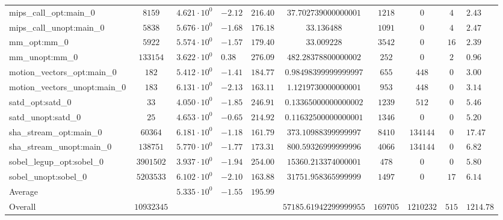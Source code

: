 \begin{tabular}{|l|c|HHc|c|c|c|cH|}
mips\_call\_opt:main\_0                         & $ 8159     $ & $ 4.621 \cdot 10^{0} $ & $ -2.12 $ & $ 216.40 $ & $ 37.702739000000001   $ & $ 1218   $ & $ 0       $ & $ 4   $ & $ 2.43    $ \\
mips\_call\_unopt:main\_0                       & $ 5838     $ & $ 5.676 \cdot 10^{0} $ & $ -1.68 $ & $ 176.18 $ & $ 33.136488            $ & $ 1091   $ & $ 0       $ & $ 4   $ & $ 2.47    $ \\
mm\_opt:mm\_0                                   & $ 5922     $ & $ 5.574 \cdot 10^{0} $ & $ -1.57 $ & $ 179.40 $ & $ 33.009228            $ & $ 3542   $ & $ 0       $ & $ 16  $ & $ 2.39    $ \\
mm\_unopt:mm\_0                                 & $ 133154   $ & $ 3.622 \cdot 10^{0} $ & $ 0.38  $ & $ 276.09 $ & $ 482.28378800000002   $ & $ 252    $ & $ 0       $ & $ 2   $ & $ 0.96    $ \\
motion\_vectors\_opt:main\_0                    & $ 182      $ & $ 5.412 \cdot 10^{0} $ & $ -1.41 $ & $ 184.77 $ & $ 0.98498399999999997  $ & $ 655    $ & $ 448     $ & $ 0   $ & $ 3.00    $ \\
motion\_vectors\_unopt:main\_0                  & $ 183      $ & $ 6.131 \cdot 10^{0} $ & $ -2.13 $ & $ 163.11 $ & $ 1.1219730000000001   $ & $ 953    $ & $ 448     $ & $ 0   $ & $ 3.14    $ \\
satd\_opt:satd\_0                               & $ 33       $ & $ 4.050 \cdot 10^{0} $ & $ -1.85 $ & $ 246.91 $ & $ 0.13365000000000002  $ & $ 1239   $ & $ 512     $ & $ 0   $ & $ 5.46    $ \\
satd\_unopt:satd\_0                             & $ 25       $ & $ 4.653 \cdot 10^{0} $ & $ -0.65 $ & $ 214.92 $ & $ 0.11632500000000001  $ & $ 1346   $ & $ 0       $ & $ 0   $ & $ 5.20    $ \\
sha\_stream\_opt:main\_0                        & $ 60364    $ & $ 6.181 \cdot 10^{0} $ & $ -1.18 $ & $ 161.79 $ & $ 373.10988399999997   $ & $ 8410   $ & $ 134144  $ & $ 0   $ & $ 17.47   $ \\
sha\_stream\_unopt:main\_0                      & $ 138751   $ & $ 5.770 \cdot 10^{0} $ & $ -1.77 $ & $ 173.31 $ & $ 800.59326999999996   $ & $ 4066   $ & $ 134144  $ & $ 0   $ & $ 6.82    $ \\
sobel\_legup\_opt:sobel\_0                      & $ 3901502  $ & $ 3.937 \cdot 10^{0} $ & $ -1.94 $ & $ 254.00 $ & $ 15360.213374000001   $ & $ 478    $ & $ 0       $ & $ 0   $ & $ 5.80    $ \\
sobel\_unopt:sobel\_0                           & $ 5203533  $ & $ 6.102 \cdot 10^{0} $ & $ -2.10 $ & $ 163.88 $ & $ 31751.958365999999   $ & $ 1497   $ & $ 0       $ & $ 17  $ & $ 6.14    $ \\
\hline
Average                                         & $          $ & $ 5.335 \cdot 10^{0} $ & $ -1.55 $ & $ 195.99 $ & $                      $ & $        $ & $         $ & $     $ & $         $ \\
\hline
Overall                                         & $ 10932345 $ & $                    $ & $       $ & $        $ & $ 57185.61942299999955 $ & $ 169705 $ & $ 1210232 $ & $ 515 $ & $ 1214.78 $ \\
\hline
\end{tabular}
